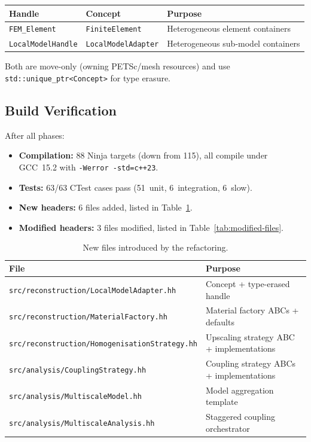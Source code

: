 \begin{center}
\begin{tabular}{lll}
  \toprule
  \textbf{Handle} & \textbf{Concept} & \textbf{Purpose} \\
  \midrule
  \texttt{FEM\_Element} & \texttt{FiniteElement} & Heterogeneous element containers \\
  \texttt{LocalModelHandle} & \texttt{LocalModelAdapter} & Heterogeneous sub-model containers \\
  \bottomrule
\end{tabular}
\end{center}

Both are move-only (owning PETSc/mesh resources) and use
\texttt{std::unique\_ptr<Concept>} for type erasure.

\subsection{Build Verification}
\label{sec:refactor-build-verification}

After all phases:

\begin{itemize}
  \item \textbf{Compilation:} 88 Ninja targets (down from 115),
    all compile under GCC~15.2 with \texttt{-Werror -std=c++23}.
  \item \textbf{Tests:} 63/63 CTest cases pass (51~unit, 6~integration,
    6~slow).
  \item \textbf{New headers:} 6 files added, listed in
    Table~\ref{tab:new-files}.
  \item \textbf{Modified headers:} 3 files modified, listed in
    Table~\ref{tab:modified-files}.
\end{itemize}

\begin{table}[htbp]
  \centering
  \caption{New files introduced by the refactoring.}
  \label{tab:new-files}
  \small
  \begin{tabular}{@{}ll@{}}
    \toprule
    \textbf{File} & \textbf{Purpose} \\
    \midrule
    \texttt{src/reconstruction/LocalModelAdapter.hh} &
      Concept + type-erased handle \\
    \texttt{src/reconstruction/MaterialFactory.hh} &
      Material factory ABCs + defaults \\
    \texttt{src/reconstruction/HomogenisationStrategy.hh} &
      Upscaling strategy ABC + implementations \\
    \texttt{src/analysis/CouplingStrategy.hh} &
      Coupling strategy ABCs + implementations \\
    \texttt{src/analysis/MultiscaleModel.hh} &
      Model aggregation template \\
    \texttt{src/analysis/MultiscaleAnalysis.hh} &
      Staggered coupling orchestrator \\
    \bottomrule
  \end{tabular}
\end{table}

